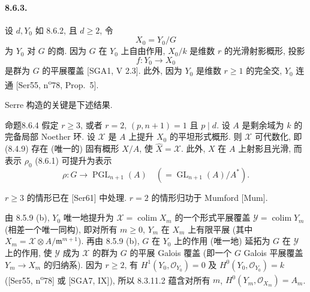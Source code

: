 \paragraph{8.6.3.}
设 $d,Y_0$ 如 8.6.2, 且 $d\geq2$, 令
\[X_0=Y_0/G\]
为 $Y_0$ 对 $G$ 的商. 因为 $G$ 在 $Y_0$ 上自由作用, $X_0/k$ 是维数 $r$ 的光滑射影概形, 投影
\[f:Y_0\longrightarrow X_0\]
是群为 $G$ 的平展覆盖 [SGA1, V 2.3]. 此外, 因为 $Y_0$ 是维数 $r\geq1$ 的完全交, $Y_0$ 连通 [Ser55, n\textsuperscript{o}78, Prop.~5].

Serre 构造的关键是下述结果.
\begin{origstatement}{命题}{8.6.4}\label{ch08:prop864}
假定 $r\geq3$, 或者 $r=2$, $(p,n+1)=1$ 且 $p\mid d$. 设 $A$ 是剩余域为 $k$ 的完备局部 Noether 环. 设 $\mathcal X$ 是 $A$ 上提升 $X_0$ 的平坦形式概形. 则 $\mathcal X$ 可代数化, 即 (8.4.9) 存在 (唯一的) 固有概形 $X/A$, 使 $\widehat X=\mathcal X$. 此外, $X$ 在 $A$ 上射影且光滑, 而表示 $\rho_0$ (8.6.1) 可提升为表示
\[\rho:G\longrightarrow\operatorname{PGL}_{n+1}(A)\quad(=\operatorname{GL}_{n+1}(A)/A^*).\]
\end{origstatement}
$r\geq3$ 的情形已在 [Ser61] 中处理. $r=2$ 的情形归功于 Mumford [Mum].

由 8.5.9 (b), $Y_0$ 唯一地提升为 $\mathcal X=\operatorname{colim}X_m$ 的一个形式平展覆盖 $\mathcal Y=\operatorname{colim}Y_m$ (相差一个唯一同构), 即对所有 $m\geq0$, $Y_m$ 在 $X_m$ 上有限平展 (其中 $X_m=\mathcal X\otimes A/\mathfrak m^{m+1}$). 再由 8.5.9 (b), $G$ 在 $Y_0$ 上的作用 (唯一地) 延拓为 $G$ 在 $\mathcal Y$ 上的作用, 使 $\mathcal Y$ 成为 $\mathcal X$ 的群为 $G$ 的平展 Galois 覆盖 (即一个 $G$ Galois 平展覆盖 $Y_m\to X_m$ 的归纳系). 因为 $r\geq2$, 有 $H^1(Y_0,\mathcal O_{Y_0})=0$ 及 $H^0(Y_0,\mathcal O_{Y_0})=k$ ([Ser55, n\textsuperscript{o}78] 或 [SGA7, IX]), 所以 8.3.11.2 蕴含对所有 $m$, $H^0(Y_m,\mathcal O_{X_m})=A_m$.

